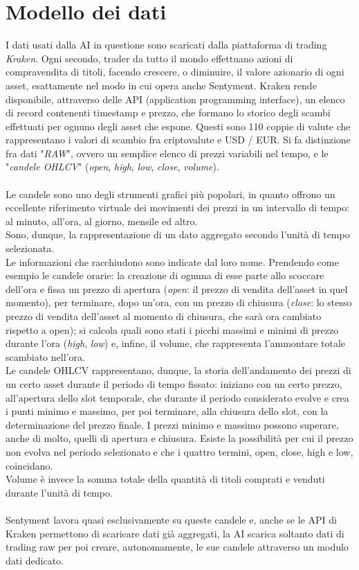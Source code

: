 \documentclass[a4paper,12pt]{report}
\begin{document}
\section{Modello dei dati}
I dati usati dalla AI in questione sono scaricati dalla piattaforma di trading \textit{Kraken}. Ogni secondo, trader da tutto il mondo effettuano azioni di compravendita di titoli, facendo crescere, o diminuire, il valore azionario di ogni asset, esattamente nel modo in cui opera anche Sentyment. Kraken rende disponibile, attraverso delle API (application programming interface), un elenco di record contenenti timestamp e prezzo, che formano lo storico degli scambi effettuati per ognuno degli asset che espone. Questi sono 110 coppie di valute che rappresentano i valori di scambio fra criptovalute e USD / EUR. Si fa distinzione fra dati "\textit{RAW}", ovvero un semplice elenco di prezzi variabili nel tempo, e le "\textit{candele OHLCV}" (\textit{open}, \textit{high}, \textit{low}, \textit{close}, \textit{volume}).\\~\\ Le candele sono uno degli strumenti grafici più popolari, in quanto offrono un eccellente riferimento virtuale dei movimenti dei prezzi in un intervallo di tempo: al minuto, all'ora, al giorno, mensile ed altro.\\Sono, dunque, la rappresentazione di un dato aggregato secondo l'unità di tempo selezionata.\\Le informazioni che racchiudono sono indicate dal loro nome. Prendendo come esempio le candele orarie: la creazione di ognuna di esse parte allo scoccare dell'ora e fissa un prezzo di apertura (\textit{open}: il prezzo di vendita dell'asset in quel momento), per terminare, dopo un'ora, con un prezzo di chiusura (\textit{close}: lo stesso prezzo di vendita dell'asset al momento di chiusura, che sarà ora cambiato rispetto a open); si calcola quali sono stati i picchi massimi e minimi di prezzo durante l'ora (\textit{high}, \textit{low}) e, infine, il volume, che rappresenta l'ammontare totale scambiato nell'ora.\\
Le candele OHLCV rappresentano, dunque, la storia dell'andamento dei prezzi di un certo asset durante il periodo di tempo fissato: iniziano con un certo prezzo, all'apertura dello slot temporale, che durante il periodo considerato evolve e crea i punti minimo e massimo, per poi terminare, alla chiusura dello slot, con la determinazione del prezzo finale. I prezzi minimo e massimo possono superare, anche di molto, quelli di apertura e chiusura. Esiste la possibilità per cui il prezzo non evolva nel periodo selezionato e che i quattro termini, open, close, high e low, coincidano.\\ Volume è invece la somma totale della quantità di titoli comprati e venduti durante l'unità di tempo.\\~\\
Sentyment lavora quasi esclusivamente su queste candele e, anche se le API di Kraken permettono di scaricare dati già aggregati, la AI scarica soltanto dati di trading raw per poi creare, autonomamente, le sue candele attraverso un modulo dati dedicato.
\end{document}
